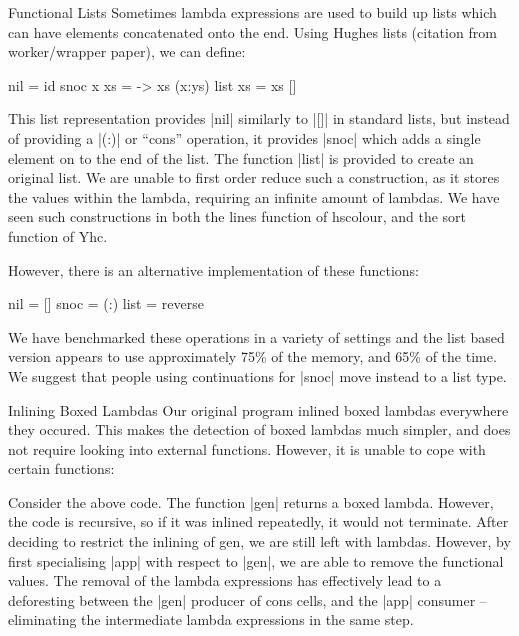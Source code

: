 \documentclass[preprint]{sigplanconf}
\begin{document}
\begin{examplename}{Functional Lists}
Sometimes lambda expressions are used to build up lists which can have elements concatenated onto the end. Using Hughes lists (citation from worker/wrapper paper), we can define:

\begin{code}
nil = id
snoc x xs = \ys -> xs (x:ys)
list xs = xs []
\end{code}

This list representation provides |nil| similarly to |[]| in standard lists, but instead of providing a |(:)| or ``cons'' operation, it provides |snoc| which adds a single element on to the end of the list. The function |list| is provided to create an original list. We are unable to first order reduce such a construction, as it stores the values within the lambda, requiring an infinite amount of lambdas. We have seen such constructions in both the lines function of hscolour, and the sort function of Yhc.

However, there is an alternative implementation of these functions:

\begin{code}
nil = []
snoc = (:)
list = reverse
\end{code}

We have benchmarked these operations in a variety of settings and the list based version appears to use approximately 75\% of the memory, and 65\% of the time. We suggest that people using continuations for |snoc| move instead to a list type.
\end{examplename}


\begin{examplename}{Inlining Boxed Lambdas}
Our original program inlined boxed lambdas everywhere they occured. This makes the detection of boxed lambdas much simpler, and does not require looking into external functions. However, it is unable to cope with certain functions:


Consider the above code. The function |gen| returns a boxed lambda. However, the code is recursive, so if it was inlined repeatedly, it would not terminate. After deciding to restrict the inlining of gen, we are still left with lambdas. However, by first specialising |app| with respect to |gen|, we are able to remove the functional values. The removal of the lambda expressions has effectively lead to a deforesting between the |gen| producer of cons cells, and the |app| consumer -- eliminating the intermediate lambda expressions in the same step.
\end{examplename}
\end{document}
